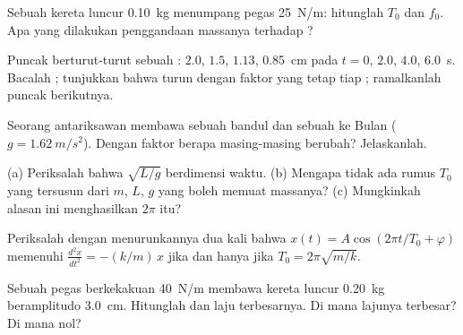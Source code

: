 \begin{exercise}[$\star$]\label{exo:g12:oscillators-and-time:3}
Sebuah kereta luncur \qty{0.10}{kg} menumpang pegas \qty{25}{N/m}: hitunglah $T_0$
dan $f_0$. Apa yang dilakukan penggandaan massanya terhadap ?
\end{exercise}

\begin{exercise}[$\star$]\label{exo:g12:oscillators-and-time:4}
Puncak berturut-turut sebuah  : $2.0$, $1.5$, $1.13$,
\qty{0.85}{cm} pada $t = 0$, $2.0$, $4.0$, \qty{6.0}{s}. Bacalah
; tunjukkan bahwa  turun dengan faktor yang tetap
tiap ; ramalkanlah puncak berikutnya.
\end{exercise}

\begin{exercise}[$\star$]\label{exo:g12:oscillators-and-time:5}
Seorang antariksawan membawa sebuah bandul dan sebuah  ke
Bulan ($g = \qty{1.62}{m/s^2}$). Dengan faktor berapa masing-masing 
berubah? Jelaskanlah.
\end{exercise}

\begin{exercise}[$\star\star$]\label{exo:g12:oscillators-and-time:6}
(a) Periksalah bahwa $\sqrt{L/g}$ berdimensi waktu. (b) Mengapa
tidak ada rumus $T_0$ yang tersusun dari $m$, $L$, $g$ yang boleh memuat massanya?
(c) Mungkinkah alasan ini menghasilkan $2\pi$ itu?
\end{exercise}

\begin{exercise}[$\star\star$]\label{exo:g12:oscillators-and-time:7}
Periksalah dengan menurunkannya dua kali bahwa $x(t) = A\cos(2\pi t/T_0 +
\varphi)$ memenuhi $\frac{d^2x}{dt^2} = -(k/m)\,x$ jika dan hanya jika
$T_0 = 2\pi\sqrt{m/k}$.
\end{exercise}

\begin{exercise}[$\star\star$]\label{exo:g12:oscillators-and-time:8}
Sebuah pegas berkekakuan \qty{40}{N/m} membawa kereta luncur \qty{0.20}{kg}
beramplitudo \qty{3.0}{cm}. Hitunglah  dan
laju terbesarnya. Di mana lajunya terbesar? Di mana nol?
\end{exercise}

